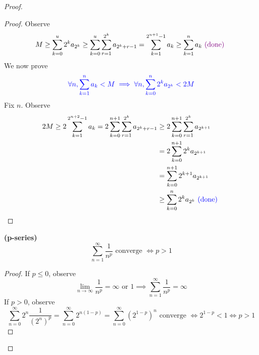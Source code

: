 \documentclass{report}
\begin{document}
\begin{proof}
\begin{proof}
Observe
\begin{equation}
M\geq \sum_{k=0}^u 2^k a_{2^k}\geq \sum_{k=0}^u \sum_{r=1}^{2^k} a_{2^{k}+r-1}=\sum_{k=1}^{2^{u+1}-1} a_k\geq \sum_{k=1}^n a_k\textcolor{violet}{\text{ (done) }}
\end{equation}
We now prove
\begin{equation}
  \textcolor{blue}{\forall n,\sum_{k=1}^n a_k<M\implies \forall n, \sum_{k=0}^n 2^ka_{2^k}<2M}
\end{equation}
Fix $n$. Observe
\begin{align}
  2M\geq 2\sum_{k=1}^{2^{n+2}-1} a_k=2\sum_{k=0}^{n+1}\sum_{r=1}^{2^k}a_{2^k+r-1}&\geq 2\sum_{k=0}^{n+1} \sum_{r=1}^{2^k}a_{2^{k+1}}\\
  &=2\sum_{k=0}^{n+1} 2^ka_{2^{k+1}}\\
  &=\sum_{k=0}^{n+1} 2^{k+1}a_{2^{k+1}}\\
  &\geq \sum_{k=0}^n 2^{k}a_{2^k}\textcolor{blue}{\text{ (done) }}
\end{align}
\end{proof}
\begin{corollary}
\label{4.2.12}
\textbf{(p-series)}
\begin{equation}
\sum_{n=1}^\infty \frac{1}{n^p}\text{ converge }\iff  p>1
\end{equation}
\end{corollary}
\begin{proof}
If $p\leq 0$, observe
\begin{equation}
\lim_{n\to\infty}\frac{1}{n^p}=\infty\text{ or }1\implies \sum_{n=1}^\infty \frac{1}{n^p}=\infty
\end{equation}
If $p>0$, observe
 \begin{equation}
\sum_{n=0}^\infty 2^n \frac{1}{(2^n)^p}=\sum_{n=0}^\infty 2^{n(1-p)}=\sum_{n=0}^\infty (2^{1-p})^n\text{ converge }\iff 2^{1-p}<1\iff p>1
\end{equation}
\end{proof}


\end{proof}
\end{document}
